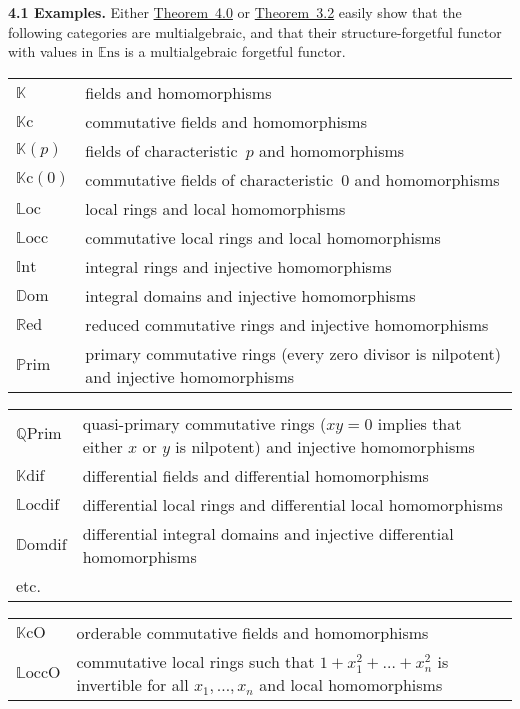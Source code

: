 \documentclass{article}
\newenvironment{rmenv}[1]
  {\phantomsection\par\medskip\noindent\textbf{#1.}\rmfamily}
  {\par\medskip}
\newcommand{\bb}[1]{{\mathbb{#1}}}
\newcommand{\Set}{\mathbb{E}\mathrm{ns}}
\newcommand{\oldpage}[1]{\marginpar{\footnotesize$\Big\vert$ \textit{p.~#1}}}
\begin{document}
\begin{rmenv}{4.1 Examples}
\label{4.1}
  Either \hyperref[4.0]{Theorem~4.0} or \hyperref[3.2]{Theorem~3.2} easily show that the following categories are multialgebraic, and that their structure-forgetful functor with values in $\Set$ is a multialgebraic forgetful functor.
  \begin{longtable}{p{0.5in}p{4.4in}}
    $\bb{K}$ & fields and homomorphisms
  \\$\bb{K}\mathrm{c}$ & commutative fields and homomorphisms
  \\$\bb{K}(p)$ & fields of characteristic~$p$ and homomorphisms
  \\$\bb{K}\mathrm{c}(0)$ & commutative fields of characteristic~$0$ and homomorphisms
  \\$\bb{L}\mathrm{oc}$ & local rings and local homomorphisms
  \\$\bb{L}\mathrm{occ}$ & commutative local rings and local homomorphisms
  \\$\bb{I}\mathrm{nt}$ & integral rings and injective homomorphisms
  \\$\bb{D}\mathrm{om}$ & integral domains and injective homomorphisms
  \\$\bb{R}\mathrm{ed}$ & reduced commutative rings and injective homomorphisms
  \\$\bb{P}\mathrm{rim}$ & primary commutative rings (every zero divisor is nilpotent) and injective homomorphisms
  \end{longtable}
\oldpage{205}
  \begin{longtable}{p{0.5in}p{4.4in}}
    $\bb{Q}\mathrm{Prim}$ & quasi-primary commutative rings ($xy=0$ implies that either $x$ or $y$ is nilpotent) and injective homomorphisms
  \\$\bb{K}\mathrm{dif}$ & differential fields and differential homomorphisms
  \\$\bb{L}\mathrm{ocdif}$ & differential local rings and differential local homomorphisms
  \\$\bb{D}\mathrm{omdif}$ & differential integral domains and injective differential homomorphisms
  \\etc.
  \end{longtable}
  \begin{longtable}{p{0.5in}p{4.4in}}
    $\bb{K}\mathrm{cO}$ & orderable commutative fields and homomorphisms
  \\$\bb{L}\mathrm{occO}$ & commutative local rings such that $1+x_1^2+\ldots+x_n^2$ is invertible for all $x_1,\ldots,x_n$ and local homomorphisms

\end{longtable}
\end{rmenv}
\end{document}
